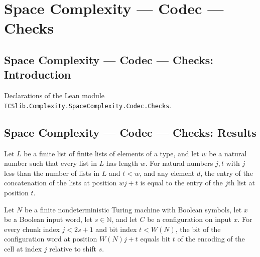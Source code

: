 \section{Space Complexity --- Codec --- Checks}
\subsection*{Space Complexity --- Codec --- Checks: Introduction}

Declarations of the Lean module \texttt{TCSlib.Complexity.SpaceComplexity.Codec.Checks}.

\subsection*{Space Complexity --- Codec --- Checks: Results}

\begin{lemma}
\label{Complexity.Codec.getD_flatten_block}
\leanok
{}
Let $L$ be a finite list of finite lists of elements of a type, and let $w$ be a natural
number such that every list in $L$ has length $w$. For natural numbers $j,t$ with $j$
less than the number of lists in $L$ and $t<w$, and any element $d$, the entry of the
concatenation of the lists at position $wj+t$ is equal to the entry of the $j$th list at
position $t$.
\end{lemma}

\begin{lemma}
\label{Complexity.Codec.getD_cfgWord_chunk}
\leanok
{}
Let $N$ be a finite nondeterministic Turing machine with Boolean symbols, let $x$ be a
Boolean input word, let $s\in\mathbb{N}$, and let $C$ be a configuration on input $x$.
For every chunk index $j<2s+1$ and bit index $t<W(N)$, the bit of the configuration word
at position $W(N)j+t$ equals bit $t$ of the encoding of the cell at index $j$ relative
to shift $s$.
\end{lemma}

